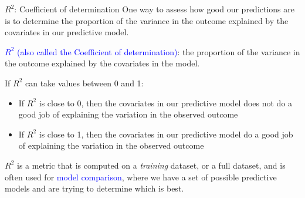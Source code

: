\documentclass[10pt,t]{beamer}
\begin{document}
\begin{frame}{$R^2$: Coefficient of determination}
One way to assess how good our predictions are is to determine the proportion of the variance in the outcome explained by the covariates in our predictive model.

\vspace{0.3cm}

\textcolor{blue}{$R^2$ (also called the Coefficient of determination)}: the proportion of the variance in the outcome explained by the covariates in the model. 

\vspace{0.3cm}

If $R^2$ can take values between 0 and 1:

\vspace{0.3cm}

\begin{itemize}
	\item If $R^2$ is close to 0, then the covariates in our predictive model does not do a good job of explaining the variation in the observed outcome
	\item If $R^2$ is close to 1, then the covariates in our predictive model do a good job of explaining the variation in the observed outcome
\end{itemize}

\vspace{0.3cm}

$R^2$ is a metric that is computed on a \textit{training} dataset, or a full dataset, and is often used for \textcolor{blue}{model comparison}, where we have a set of possible predictive models and are trying to determine which is best.
\end{frame}
\end{document}
